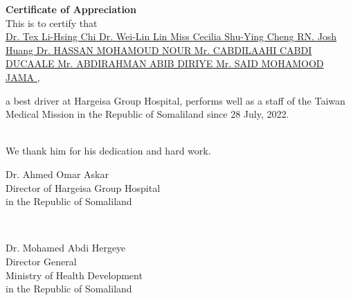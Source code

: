\documentclass[a4paper, landscape]{article}
\newcommand{\members}[1]{%
    \ifcase#1
    \or Dr. Tex Li-Hsing Chi
    \or Dr. Wei-Lin Lin
    \or Miss Cecilia Shu-Ying Cheng
    \or RN. Josh Huang
    \or Dr. HASSAN MOHAMOUD NOUR %
    \or Mr. CABDILAAHI CABDI DUCAALE
    \or Mr. ABDIRAHMAN ABIB DIRIYE %
    \or Mr. SAID MOHAMOOD JAMA %
    \fi
}
\begin{document}
\begin{center}

{\Huge\textbf{Certificate of Appreciation}}\\[0.6cm]

\raisebox{-0.6\height}{}  \hspace{0.3cm}
This is to certify that \hspace{0.3cm}
\raisebox{-0.6\height}{} \\[0.4cm]

{\Huge\underline{\members{6},}}\\[0.2cm]



\begin{flushleft}
\Large
a best driver at Hargeisa Group Hospital, performs well as a staff of the Taiwan Medical Mission in the Republic of Somaliland since 28 July, 2022.


\end{flushleft}\\[0.5cm]

We thank him for his dedication and hard work. \\[1cm]

\begin{minipage}{0.4\textwidth}
\begin{flushleft} \large
Dr. Ahmed Omar Askar \\
Director of Hargeisa Group Hospital\\
in the Republic of Somaliland \\

\end{flushleft}
\end{minipage}
~
\begin{minipage}{0.4\textwidth}
\begin{flushright} \large
Dr. Mohamed Abdi Hergeye\\
Director General \\
Ministry of Health Development \\
in the Republic of Somaliland


\end{flushright}
\end{minipage}
\end{center}
\end{document}
